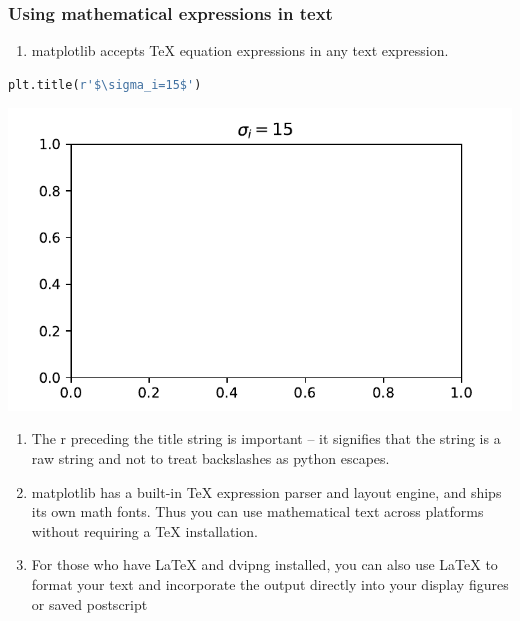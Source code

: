 \documentclass[UTF8,a4paper,12pt]{ctexart}  %
\providecommand{\tightlist}{\setlength{\itemsep}{0pt}\setlength{\parskip}{0pt}}
\begin{document}
\hypertarget{using-mathematical-expressions-in-text}{%
\subsubsection{Using mathematical expressions in text}\label{using-mathematical-expressions-in-text}}

\begin{enumerate}
\def\labelenumi{\arabic{enumi}.}
\tightlist
\item
  matplotlib accepts TeX equation expressions in any text expression.
\end{enumerate}

\begin{lstlisting}[language=Python]
plt.title(r'$\sigma_i=15$')
\end{lstlisting}

\begin{center}\includegraphics[width=0.9\linewidth]{python-visualization_files/figure-latex/unnamed-chunk-18-1} \end{center}

\begin{enumerate}
\def\labelenumi{\arabic{enumi}.}
\tightlist
\item
  The r preceding the title string is important -- it signifies
  that the string is a raw string and not to treat backslashes as
  python escapes.
\item
  matplotlib has a built-in TeX expression parser and layout engine,
  and ships its own math fonts. Thus you can use mathematical text
  across platforms without requiring a TeX installation.
\item
  For those who have LaTeX and dvipng installed, you can also use
  LaTeX to format your text and incorporate the output directly into
  your display figures or saved postscript
\end{enumerate}
\end{document}
